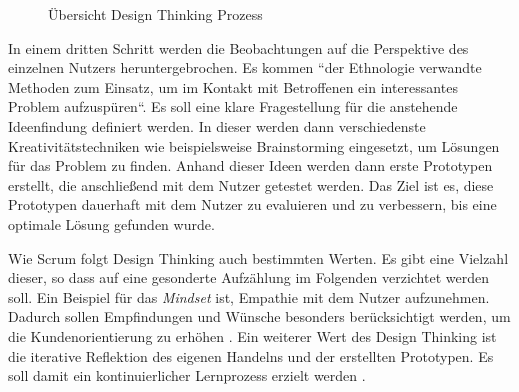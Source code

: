 \begin{figure}[H]
	\centering
	\caption[Übersicht Design Thinking Prozess]{Übersicht Design Thinking Prozess \protect \footnotemark}
	\label{fig:designthinking}
\end{figure}

In einem dritten Schritt werden die Beobachtungen auf die Perspektive des einzelnen Nutzers heruntergebrochen. Es kommen ``der Ethnologie verwandte Methoden zum Einsatz, um im Kontakt mit Betroffenen ein interessantes Problem aufzuspüren``\cite[S. 3]{meinel_design_2016}. Es soll eine klare Fragestellung für die anstehende Ideenfindung definiert werden. In dieser werden dann verschiedenste Kreativitätstechniken wie beispielsweise Brainstorming eingesetzt, um Lösungen für das Problem zu finden. Anhand dieser Ideen werden dann erste Prototypen erstellt, die anschließend mit dem Nutzer getestet werden. Das Ziel ist es, diese Prototypen dauerhaft mit dem Nutzer zu evaluieren und zu verbessern, bis eine optimale Lösung gefunden wurde.

Wie Scrum folgt Design Thinking auch bestimmten Werten. Es gibt eine Vielzahl dieser, so dass auf eine gesonderte Aufzählung im Folgenden verzichtet werden soll. Ein Beispiel für das \textit{Mindset} ist, Empathie mit dem Nutzer aufzunehmen. Dadurch sollen Empfindungen und Wünsche besonders berücksichtigt werden, um die Kundenorientierung zu erhöhen \cite[S. 3]{lewrick_design_2018}. Ein weiterer Wert des Design Thinking ist die iterative Reflektion des eigenen Handelns und der erstellten Prototypen. Es soll damit ein kontinuierlicher Lernprozess erzielt werden \cite[S. 3]{lewrick_design_2018}. 

